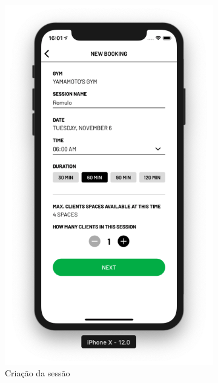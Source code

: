 \begin{figure}[H]
	\centering
    \begin{subfigure}[b]{0.3\textwidth}
        \includegraphics[width=\textwidth]{pfc/figuras/tr-new-booking.png}
        \caption{Criação da sessão}
        \label{fig:tr-new-booking}
    \end{subfigure}
    ~
	\begin{subfigure}[b]{0.3\textwidth}

\end{subfigure}
\end{figure}
